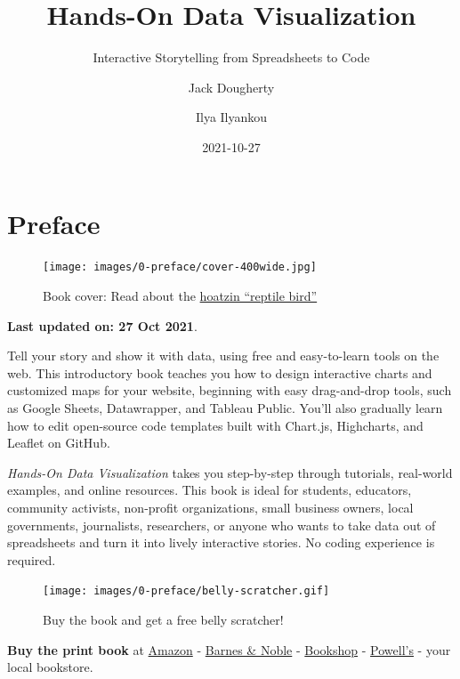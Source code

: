 \documentclass[
  english,
]{book}
\title{Hands-On Data Visualization}
\subtitle{Interactive Storytelling from Spreadsheets to Code}
\author{Jack Dougherty \and Ilya Ilyankou}
\date{2021-10-27}
\begin{document}
\maketitle

{
\setcounter{tocdepth}{1}
\tableofcontents
}
\hypertarget{preface}{%
\chapter*{Preface}\label{preface}}

\begin{figure}
\centering
\texttt{[image: images/0-preface/cover-400wide.jpg]}
\caption{Book cover: Read about the \href{https://en.wikipedia.org/wiki/Hoatzin}{hoatzin ``reptile bird''}}
\end{figure}

\textbf{Last updated on: 27 Oct 2021}.

Tell your story and show it with data, using free and easy-to-learn tools on the web. This introductory book teaches you how to design interactive charts and customized maps for your website, beginning with easy drag-and-drop tools, such as Google Sheets, Datawrapper, and Tableau Public. You'll also gradually learn how to edit open-source code templates built with Chart.js, Highcharts, and Leaflet on GitHub.

\emph{Hands-On Data Visualization} takes you step-by-step through tutorials, real-world examples, and online resources. This book is ideal for students, educators, community activists, non-profit organizations, small business owners, local governments, journalists, researchers, or anyone who wants to take data out of spreadsheets and turn it into lively interactive stories. No coding experience is required.

\begin{figure}
\centering
\texttt{[image: images/0-preface/belly-scratcher.gif]}
\caption{Buy the book and get a free belly scratcher!}
\end{figure}

\textbf{Buy the print book} at \href{https://www.amazon.com/Hands-Data-Visualization-Storytelling-Spreadsheets/dp/1492086002/}{Amazon} - \href{https://www.barnesandnoble.com/w/hands-on-data-visualization-jack-dougherty/1137725933}{Barnes \& Noble} - \href{https://bookshop.org/books/hands-on-data-visualization-interactive-storytelling-from-spreadsheets-to-code/9781492086000}{Bookshop} - \href{https://www.powells.com/book/hands-on-data-visualization-9781492086000}{Powell's} - your local bookstore.
\end{document}
